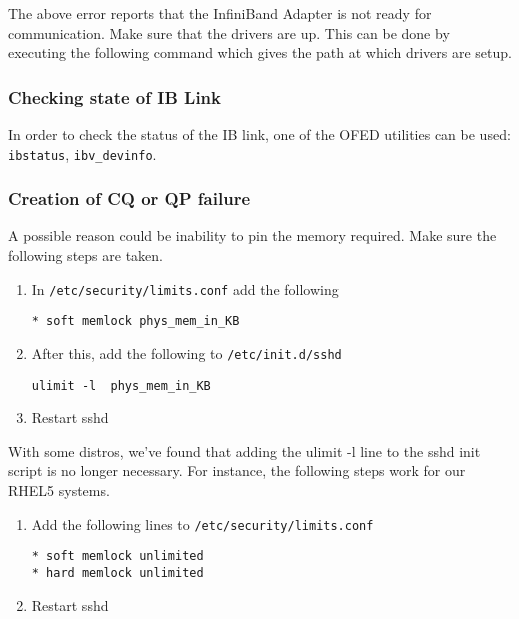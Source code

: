     The above error reports that the InfiniBand Adapter is not ready for
communication. Make sure that the drivers are up. This can be done by executing
the following command which  gives the path at which drivers are setup.


\subsubsection{Checking state of IB Link}
In order to check the status of the IB link, one of the OFED utilities
can be used: \texttt{ibstatus}, \texttt{ibv\_devinfo}.


\subsubsection{Creation of CQ or QP failure}
A possible reason could be inability to pin the memory required.  Make sure the
following steps are taken.

\begin{enumerate}
\item In \texttt{/etc/security/limits.conf} add the following
\begin{verbatim}
* soft memlock phys_mem_in_KB
\end{verbatim}

\item After this, add the following to \texttt{/etc/init.d/sshd}
\begin{verbatim}
ulimit -l  phys_mem_in_KB
\end{verbatim}

\item Restart sshd
\end{enumerate}

With some distros, we've found that adding the ulimit -l line to the sshd init script is no longer necessary.  For instance, the following steps work for our RHEL5 systems.

\begin{enumerate}
\item Add the following lines to \texttt{/etc/security/limits.conf}
\begin{verbatim}
* soft memlock unlimited
* hard memlock unlimited
\end{verbatim}

\item Restart sshd
\end{enumerate}

